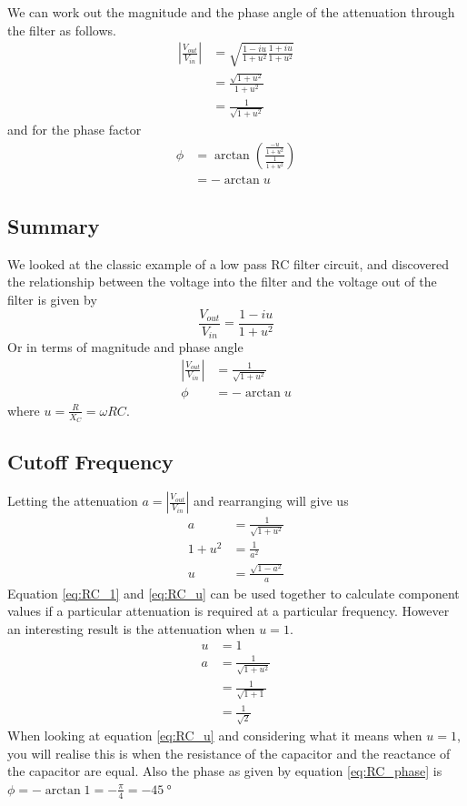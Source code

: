 We can work out the magnitude and the phase angle of the attenuation through the
filter as follows.
\begin{align}
  \left| \frac{V_{out}}{V_{in}}\right| &= \sqrt{\frac{1-iu}{1+u^2}\frac{1+iu}{1+u^2}}\nonumber \\
 &= \frac{\sqrt{1+u^2}}{1+u^2} \nonumber \\
 &= \frac{1}{\sqrt{1+u^2}} \label{eq:RC_mag}
\end{align}
and for the phase factor
\begin{align}
  \phi &= \arctan\left(\frac{\frac{-u}{1+u^2}}{\frac{1}{1+u^2}}\right) \nonumber \\
  &= -\arctan u \label{eq:RC_phase}
\end{align}

\begin{framed}
\subsection*{Summary}
We looked at the classic example of a low pass RC filter circuit, and discovered
the relationship between the voltage into the filter and the voltage out of the
filter is given by
\begin{equation*}
  \frac{V_{out}}{V_{in}} = \frac{1-iu}{1+u^2}
\end{equation*}
Or in terms of magnitude and phase angle
\begin{align*}
  \left|\frac{V_{out}}{V_{in}}\right| &= \frac{1}{\sqrt{1+u^2}} \\
  \phi &= - \arctan u
\end{align*}
where $u=\frac{R}{X_C}=\omega R C$.
\end{framed}

\subsection{Cutoff Frequency}
Letting the attenuation $a=\left| \frac{V_{out}}{V_{in}}\right|$ and rearranging will give us
\begin{align}
  a &= \frac{1}{\sqrt{1+u^2}} \nonumber \\
  1+u^2 &= \frac{1}{a^2} \nonumber \\
  u &= \frac{\sqrt{1-a^2}}{a} \label{eq:RC_1}
\end{align}
Equation \ref{eq:RC_1} and \ref{eq:RC_u} can be used together to calculate component values if a particular attenuation is required at a particular frequency. However an interesting result is the attenuation when $u=1$.
\begin{align}
  u & = 1 \nonumber \\
  a &= \frac{1}{\sqrt{1+u^2}} \nonumber \\
   &= \frac{1}{\sqrt{1+1}} \nonumber \\
  &= \frac{1}{\sqrt{2}} \label{eq:RC_cuttoff_attenuation}
\end{align}
When looking at equation \ref{eq:RC_u} and considering what it means when $u=1$, you will realise this is when the resistance of the capacitor and the
reactance of the capacitor are equal. Also the phase as given by equation \ref{eq:RC_phase} is $\phi=-\arctan{1}=-\frac{\pi}{4}=-\SI{45}{\degree}$

